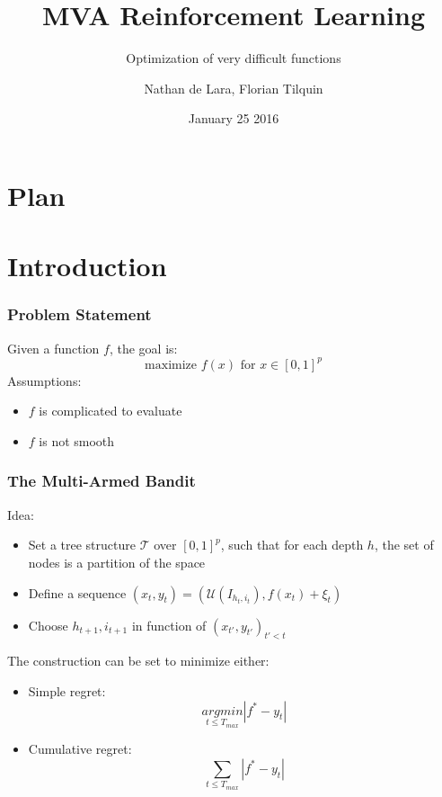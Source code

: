 \documentclass[xcolor={usenames,dvipsnames}]{beamer}
\begin{document}

\title{MVA Reinforcement Learning}
\subtitle{Optimization of very difficult functions}
\author{Nathan de Lara, Florian Tilquin}
\date{January 25 2016} 


\begin{frame}
\titlepage
\end{frame}

\usebackgroundtemplate{ }

\section*{Plan}
\begin{frame}
  \tableofcontents[]
\end{frame}

\section{Introduction}
\begin{frame}
\frametitle{Problem Statement}
Given a function $f$, the goal is:
\begin{equation}
\mbox{maximize } f(x) \mbox{ for } x\in [0,1]^p
\end{equation}
Assumptions:
\begin{itemize}
\item $f$ is complicated to evaluate
\item $f$ is not smooth
\end{itemize}
\end{frame}

\begin{frame}
\frametitle{The Multi-Armed Bandit}
Idea:
\begin{itemize}
\item Set a tree structure $\mathcal{T}$ over $[0,1]^p$, such that for each depth $h$, the set of nodes is a partition of the space
\item Define a sequence $(x_t,y_t)=(\mathcal{U}(I_{h_t,i_t}),f(x_t)+\xi_t)$
\item Choose $h_{t+1},i_{t+1}$ in function of $(x_{t'},y_{t'})_{t'<t}$
\end{itemize}
The construction can be set to minimize either:
\begin{itemize}
\item Simple regret: \begin{equation}
\underset{t\le T_{max}}{argmin}|f^*-y_t|
\end{equation}
\item Cumulative regret: \begin{equation}\underset{t\le T_{max}}{\sum}|f^*-y_t| \end{equation}
\end{itemize}
\end{frame}
\end{document}
